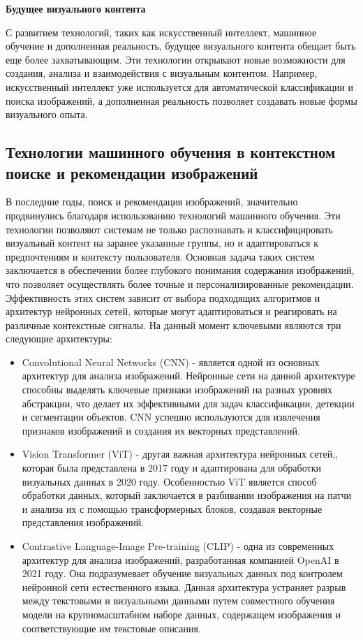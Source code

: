 \textbf{Будущее визуального контента}

С развитием технологий, таких как искусственный интеллект, машинное обучение и дополненная реальность, будущее визуального контента обещает быть еще более захватывающим. Эти технологии открывают новые возможности для создания, анализа и взаимодействия с визуальным контентом. Например, искусственный интеллект уже используется для автоматической классификации и поиска изображений, а дополненная реальность позволяет создавать новые формы визуального опыта.

\subsection{Технологии машинного обучения в контекстном поиске и рекомендации изображений}
В последние годы, поиск и рекомендация изображений, значительно продвинулись благодаря использованию технологий машинного обучения. Эти технологии позволяют системам не только распознавать и классифицировать визуальный контент на заранее указанные группы, но и адаптироваться к предпочтениям и контексту пользователя. Основная задача таких систем заключается в обеспечении более глубокого понимания содержания изображений, что позволяет осуществлять более точные и персонализированные рекомендации. Эффективность этих систем зависит от выбора подходящих алгоритмов и архитектур нейронных сетей, которые могут адаптироваться и реагировать на различные контекстные сигналы. На данный момент ключевыми являются три следующие архитектуры:

\begin{itemize}
	\item Convolutional Neural Networks (CNN) - является одной из основных архитектур для анализа изображений. Нейронные сети на данной архитектуре способны выделять ключевые признаки изображений на разных уровнях абстракции, что делает их эффективными для задач классификации, детекции и сегментации объектов. CNN успешно используются для извлечения признаков изображений и создания их векторных представлений.
	
	\item Vision Transformer (ViT) - другая важная архитектура нейронных сетей,, которая была представлена в 2017 году и адаптирована для обработки визуальных данных в 2020 году.  Особенностью ViT является способ обработки данных, который заключается в разбивании изображения на патчи и анализа их с помощью трансформерных блоков, создавая векторные представления изображений.
	
	\item Contrastive Language-Image Pre-training (CLIP) - одна из современных архитектур для анализа изображений, разработанная компанией OpenAI в 2021 году. Она подразумевает обучение визуальных данных под контролем нейронной сети естественного языка. Данная архитектура устраняет разрыв между текстовыми и визуальными данными путем совместного обучения модели на крупномасштабном наборе данных, содержащем изображения и соответствующие им текстовые описания.
	
\end{itemize}

